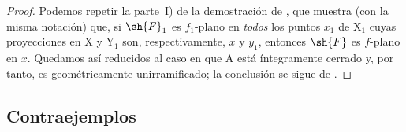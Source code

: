 \begin{proof}
Podemos repetir la parte~I) de la demostración de , que muestra (con la misma notación) que, si $\sh{F}_1$ es $f_1$-plano en \emph{todos} los puntos $x_1$ de $\mathrm{X}_1$ cuyas proyecciones en $\mathrm{X}$ y $\mathrm{Y}_1$ son, respectivamente, $x$ y $y_1$, entonces $\sh{F}$ es $f$-plano en $x$.
Quedamos así reducidos al caso en que $\mathrm{A}$ está íntegramente cerrado y, por tanto, es geométricamente unirramificado; la conclusión se sigue de .
\end{proof}

\subsection{Contraejemplos}
\label{subsection:IV.11.7}


